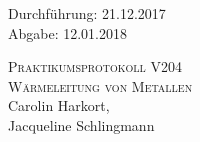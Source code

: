 

\begin{titlepage}
  \begin{flushleft}
 Durchführung: 21.12.2017\\
 Abgabe: 12.01.2018
  \end{flushleft}



 \begin{center}


\textsc{\LARGE Praktikumsprotokoll V204}\\[1.5cm]
\textsc{\huge Wärmeleitung von Metallen } \\[5,5cm]

Carolin Harkort\footnotemark[1], \\
Jacqueline Schlingmann\footnotemark[2] \\[1,0cm]



 \end{center}

 \vfill

\end{titlepage}


  
  

\nocite{*}
\printbibliography

